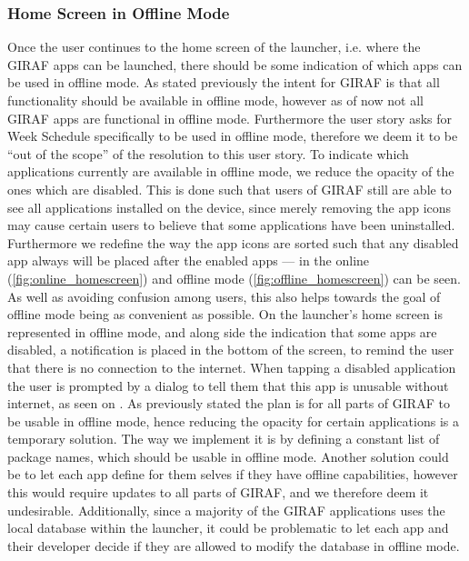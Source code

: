 \subsubsection{Home Screen in Offline Mode}
Once the user continues to the home screen of the launcher, i.e. where the GIRAF apps can be launched, there should be some indication of which apps can be used in offline mode. 
As stated previously the intent for GIRAF is that all functionality should be available in offline mode, however as of now not all GIRAF apps are functional in offline mode.
Furthermore the user story asks for Week Schedule specifically to be used in offline mode, therefore we deem it to be \enquote{out of the scope} of the resolution to this user story.
To indicate which applications currently are available in offline mode, we reduce the opacity of the ones which are disabled.
This is done such that users of GIRAF still are able to see all applications installed on the device, since merely removing the app icons may cause certain users to believe that some applications have been uninstalled.
Furthermore we redefine the way the app icons are sorted such that any disabled app always will be placed after the enabled apps --- in  the online (\ref{fig:online_homescreen}) and offline mode (\ref{fig:offline_homescreen}) can be seen.
As well as avoiding confusion among users, this also helps towards the goal of offline mode being as convenient as possible.
On  the launcher's home screen is represented in offline mode, and along side the indication that some apps are disabled, a notification is placed in the bottom of the screen, to remind the user that there is no connection to the internet.
When tapping a disabled application the user is prompted by a dialog to tell them that this app is unusable without internet, as seen on . 
As previously stated the plan is for all parts of GIRAF to be usable in offline mode, hence reducing the opacity for certain applications is a temporary solution.
The way we implement it is by defining a constant list of package names, which should be usable in offline mode.
Another solution could be to let each app define for them selves if they have offline capabilities, however this would require updates to all parts of GIRAF, and we therefore deem it undesirable.
Additionally, since a majority of the GIRAF applications uses the local database within the launcher, it could be problematic to let each app and their developer decide if they are allowed to modify the database in offline mode.

